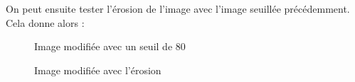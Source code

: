 \documentclass[french,a4paper,10pt]{article}
\begin{document}
	On peut ensuite tester l'érosion de l'image avec l'image seuillée précédemment.
	Cela donne alors :
	\begin{figure}[!htb]
		\begin{minipage}{0.48\textwidth}
			\centering
			\caption{Image modifiée avec un seuil de 80}\label{Fig:test-grey-08-2}
		\end{minipage}\hfill
		\begin{minipage}{0.48\textwidth}
			\centering
			\caption{Image modifiée avec l'érosion}\label{Fig:erosion-test-grey-08}
		\end{minipage}
	\end{figure}
\end{document}
